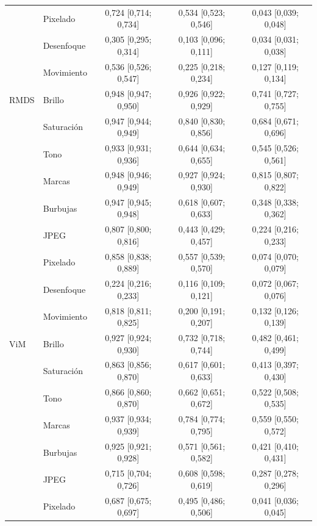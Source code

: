 {\begin{longtable}{llccc}
 & Pixelado & 0{,}724 [0{,}714; 0{,}734] & 0{,}534 [0{,}523; 0{,}546] & 0{,}043 [0{,}039; 0{,}048] \\
 & Desenfoque & 0{,}305 [0{,}295; 0{,}314] & 0{,}103 [0{,}096; 0{,}111] & 0{,}034 [0{,}031; 0{,}038] \\
 & Movimiento & 0{,}536 [0{,}526; 0{,}547] & 0{,}225 [0{,}218; 0{,}234] & 0{,}127 [0{,}119; 0{,}134] \\
\midrule
RMDS & Brillo & 0{,}948 [0{,}947; 0{,}950] & 0{,}926 [0{,}922; 0{,}929] & 0{,}741 [0{,}727; 0{,}755] \\
 & Saturación & 0{,}947 [0{,}944; 0{,}949] & 0{,}840 [0{,}830; 0{,}856] & 0{,}684 [0{,}671; 0{,}696] \\
 & Tono & 0{,}933 [0{,}931; 0{,}936] & 0{,}644 [0{,}634; 0{,}655] & 0{,}545 [0{,}526; 0{,}561] \\
 & Marcas & 0{,}948 [0{,}946; 0{,}949] & 0{,}927 [0{,}924; 0{,}930] & 0{,}815 [0{,}807; 0{,}822] \\
 & Burbujas & 0{,}947 [0{,}945; 0{,}948] & 0{,}618 [0{,}607; 0{,}633] & 0{,}348 [0{,}338; 0{,}362] \\
 & JPEG & 0{,}807 [0{,}800; 0{,}816] & 0{,}443 [0{,}429; 0{,}457] & 0{,}224 [0{,}216; 0{,}233] \\
 & Pixelado & 0{,}858 [0{,}838; 0{,}889] & 0{,}557 [0{,}539; 0{,}570] & 0{,}074 [0{,}070; 0{,}079] \\
 & Desenfoque & 0{,}224 [0{,}216; 0{,}233] & 0{,}116 [0{,}109; 0{,}121] & 0{,}072 [0{,}067; 0{,}076] \\
 & Movimiento & 0{,}818 [0{,}811; 0{,}825] & 0{,}200 [0{,}191; 0{,}207] & 0{,}132 [0{,}126; 0{,}139] \\
\midrule
ViM & Brillo & 0{,}927 [0{,}924; 0{,}930] & 0{,}732 [0{,}718; 0{,}744] & 0{,}482 [0{,}461; 0{,}499] \\
 & Saturación & 0{,}863 [0{,}856; 0{,}870] & 0{,}617 [0{,}601; 0{,}633] & 0{,}413 [0{,}397; 0{,}430] \\
 & Tono & 0{,}866 [0{,}860; 0{,}870] & 0{,}662 [0{,}651; 0{,}672] & 0{,}522 [0{,}508; 0{,}535] \\
 & Marcas & 0{,}937 [0{,}934; 0{,}939] & 0{,}784 [0{,}774; 0{,}795] & 0{,}559 [0{,}550; 0{,}572] \\
 & Burbujas & 0{,}925 [0{,}921; 0{,}928] & 0{,}571 [0{,}561; 0{,}582] & 0{,}421 [0{,}410; 0{,}431] \\
 & JPEG & 0{,}715 [0{,}704; 0{,}726] & 0{,}608 [0{,}598; 0{,}619] & 0{,}287 [0{,}278; 0{,}296] \\
 & Pixelado & 0{,}687 [0{,}675; 0{,}697] & 0{,}495 [0{,}486; 0{,}506] & 0{,}041 [0{,}036; 0{,}045] \\

\end{longtable}}
